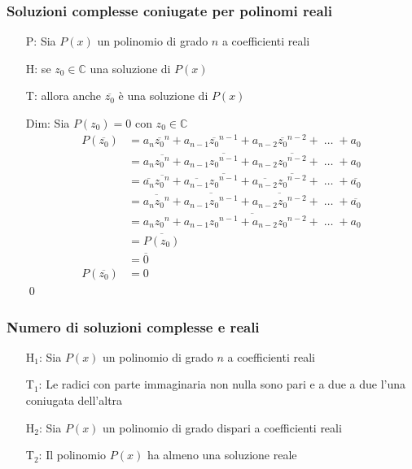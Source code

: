 \documentclass[a4paper]{article}
\begin{document}
\subsubsection*{Soluzioni complesse coniugate per polinomi reali}
\begin{itemize}
	\item[P:] Sia \(P(x)\) un polinomio di grado \(n\) a coefficienti reali
	\item[H:] se \(z_0 \in \mathbb{C}\) una soluzione di \(P(x)\)
	\item[T:] allora anche \(\overline{z_0}\) è una soluzione di \(P(x)\)
	\item[Dim:] Sia \(P(z_0) = 0\) con \(z_0 \in \mathbb{C}\)
	\begin{align*}
		P(\overline{z_0}) &= a_n \overline{z_0} ^ n + a_{n-1} \overline{z_0} ^ {n-1} + a_{n-2} \overline{z_0} ^ {n-2} + \; \dots \; + a_0 \\
		&= a_n \overline{{z_0} ^ n} + a_{n-1} \overline{{z_0} ^ {n-1}} + a_{n-2} \overline{{z_0} ^ {n-2}} + \; \dots \; + a_0 \\
		&= \overline{a_n} \overline{{z_0} ^ n} + \overline{a_{n-1}} \overline{{z_0} ^ {n-1}} + \overline{a_{n-2}} \overline{{z_0} ^ {n-2}} + \; \dots \; + \overline{a_0} \\
		&= \overline{a_n {z_0} ^ n} + \overline{a_{n-1} {z_0} ^ {n-1}} + \overline{a_{n-2} {z_0} ^ {n-2}} + \; \dots \; + \overline{a_0} \\
		&= \overline{a_n {z_0} ^ n + a_{n-1} {z_0} ^ {n-1} + a_{n-2} {z_0} ^ {n-2} + \; \dots \; + a_0} \\
		&= \overline{P(z_0)} \\
		&= \overline{0} \\
		P(\overline{z_0}) &= 0
	\end{align*}
	\qed
\end{itemize}

\subsubsection*{Numero di soluzioni complesse e reali}
\begin{itemize}
	\item[H\(_1\):] Sia \(P(x)\) un polinomio di grado \(n\) a coefficienti reali
	\item[T\(_1\):] Le radici con parte immaginaria non nulla sono pari e a due a due l'una coniugata dell'altra
	\item[H\(_2\):] Sia \(P(x)\) un polinomio di grado dispari a coefficienti reali
	\item[T\(_2\):] Il polinomio \(P(x)\) ha almeno una soluzione reale
\end{itemize}
\end{document}
